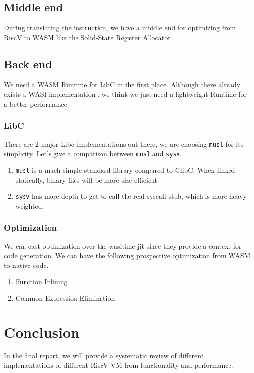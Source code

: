 \documentclass{article}
\newcommand{\code}[1]{\texttt{#1}}
\begin{document}
\subsection{Middle end}
During translating the instruction, we have a middle end for optimizing from RiscV to WASM like the Solid-State Register Allocator \cite{ssrc}.
\subsection{Back end}
We need a WASM Runtime for LibC in the first place. Although there already exists a WASI implementation \cite{wasi-sdk}, we think we just need a lightweight Runtime for a better performance
\subsubsection{LibC}
There are 2 major Libc implementations out there, we are choosing \code{musl} for its simplicity. Let's give a comparison between \code{musl} and \code{sysv}. \cite{musl-sysv-compare}
\begin{enumerate}
    \item \code{musl} is a much simple standard library compared to GlibC. When linked statically, binary files will be more size-efficient 
    \item \code{sysv} has more depth to get to call the real syscall stub, which is more heavy weighted.
\end{enumerate}
\subsubsection{Optimization}
We can cast optimization over the wasitime-jit since they provide a context for code generation. We can have the following prospective optimization from WASM to native code.
\begin{enumerate}
\item Function Inlining
\item Common Expression Elimination
\end{enumerate}
\section{Conclusion}
In the final report, we will provide a systematic review of different implementations of different RiscV VM from functionality and performance. 
\printbibliography
\end{document}
